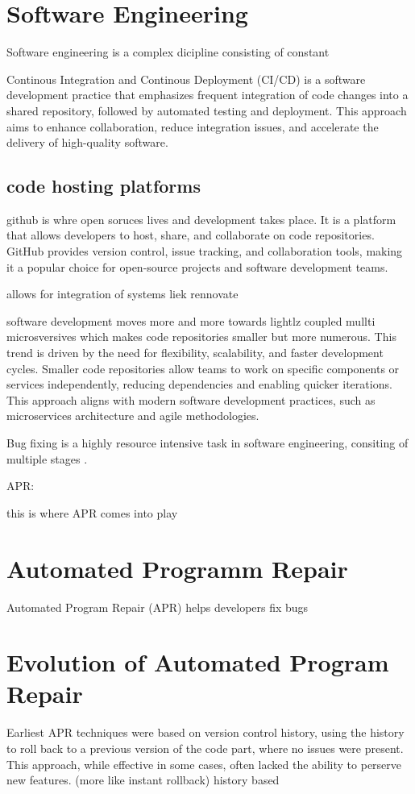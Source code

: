 \section{Software Engineering}
Software engineering is a complex dicipline consisting of constant


Continous Integration and Continous Deployment (CI/CD) is a software development practice that emphasizes frequent integration of code changes into a shared repository, followed by automated testing and deployment. This approach aims to enhance collaboration, reduce integration issues, and accelerate the delivery of high-quality software.


\subsection{code hosting platforms}
github is whre open soruces lives and development takes place. It is a platform that allows developers to host, share, and collaborate on code repositories. GitHub provides version control, issue tracking, and collaboration tools, making it a popular choice for open-source projects and software development teams.

allows for integration of systems liek rennovate


software development moves more and more towards lightlz coupled mullti microsversives which makes code repositories smaller but more numerous. This trend is driven by the need for flexibility, scalability, and faster development cycles. Smaller code repositories allow teams to work on specific components or services independently, reducing dependencies and enabling quicker iterations. This approach aligns with modern software development practices, such as microservices architecture and agile methodologies. 


Bug fixing is a highly resource intensive task in software engineering, consiting of multiple stages .

APR:

this is where APR comes into play
\section{Automated Programm Repair}

Automated Program Repair (APR) helps developers fix bugs


\section{Evolution of Automated Program Repair}
Earliest APR techniques were based on version control history, using the history to roll back to a previous version of the code part, where no issues were present. This approach, while effective in some cases, often lacked the ability to perserve new features. (more like instant rollback)
history based

